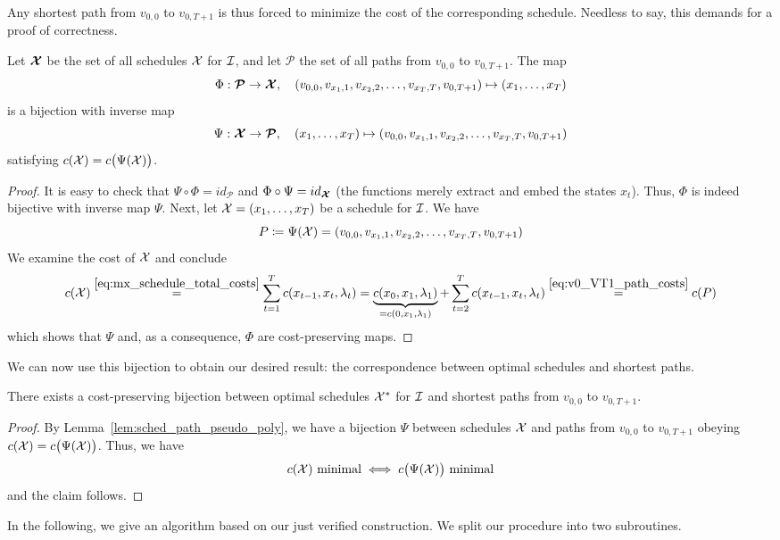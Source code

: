 Any shortest path from $v_{0,0}$ to $v_{0,T+1}$ is thus forced to minimize the cost of the corresponding schedule. Needless to say, this demands for a proof of correctness.
\begin{lem}\label{lem:sched_path_pseudo_poly}
Let $\bm{\mathcal{X}}$ be the set of all schedules $\mathcal{X}$ for $\mathcal{I}$, and let $\bm{\mathcal{P}}$ the set of all paths from $v_{0,0}$ to $v_{0,T+1}$. The map
\begin{equation*}
	\Phi:\bm{\mathcal{P}}\rightarrow\bm{\mathcal{X}},\quad (v_{0,0},v_{x_1,1},v_{x_2,2},\dotsc,v_{x_T,T},v_{0,T+1})\mapsto (x_1,\dotsc,x_T)
\end{equation*}
is a bijection with inverse map
\begin{equation*}
	\Psi:\bm{\mathcal{X}}\rightarrow\bm{\mathcal{P}},\quad(x_1,\dotsc,x_T)\mapsto (v_{0,0},v_{x_1,1},v_{x_2,2},\dotsc,v_{x_T,T},v_{0,T+1})
\end{equation*}
satisfying $c(\mathcal{X})=c\bigl(\Psi(\mathcal{X})\bigr)$.
\end{lem}
\begin{proof}
It is easy to check that $\Psi\circ\Phi=id_{\bm{\mathcal{P}}}$ and $\Phi\circ\Psi=id_{\bm{\mathcal{X}}}$ (the functions merely extract and embed the states $x_t$). Thus, $\Phi$ is indeed bijective with inverse map $\Psi$. Next, let $\mathcal{X}=(x_1,\dotsc,x_T)$ be a schedule for $\mathcal{I}$. We have
\begin{equation*}
	P\coloneqq\Psi(\mathcal{X})=(v_{0,0},v_{x_1,1},v_{x_2,2},\dotsc,v_{x_T,T},v_{0,T+1})
\end{equation*}
We examine the cost of $\mathcal{X}$ and conclude
\begin{equation*}
c(\mathcal{X})\stackrel{\eqref{eq:mx_schedule_total_costs}}{=}\sum\limits_{t=1}^{T}c(x_{t-1},x_{t},\lambda_t)=\underbrace{c(x_0,x_1,\lambda_1)}_{=c(0,x_1,\lambda_1)}+\sum\limits_{t=2}^{T}c(x_{t-1},x_{t},\lambda_t)\stackrel{\eqref{eq:v0_VT1_path_costs}}{=}c(P)
\end{equation*}
which shows that $\Psi$ and, as a consequence, $\Phi$ are cost-preserving maps.
\end{proof}
We can now use this bijection to obtain our desired result: the correspondence between optimal schedules and shortest paths.
\begin{thm}\label{thm:opt_sched_short_path_pseudo_poly}
There exists a cost-preserving bijection between optimal schedules $\mathcal{X}^*$ for $\mathcal{I}$ and shortest paths from $v_{0,0}$ to $v_{0,T+1}$.
\end{thm} 
\begin{proof}
By Lemma~\ref{lem:sched_path_pseudo_poly}, we have a bijection $\Psi$ between schedules $\mathcal{X}$ and paths from $v_{0,0}$ to $v_{0,T+1}$ obeying $c(\mathcal{X})=c\bigl(\Psi(\mathcal{X})\bigr)$. Thus, we have 
\begin{equation*}
	c(\mathcal{X})\text{ minimal}\iff c\bigl(\Psi(\mathcal{X})\big)\text{ minimal}
\end{equation*}
and the claim follows.
\end{proof}
In the following, we give an algorithm based on our just verified construction. 
We split our procedure into two subroutines. 

